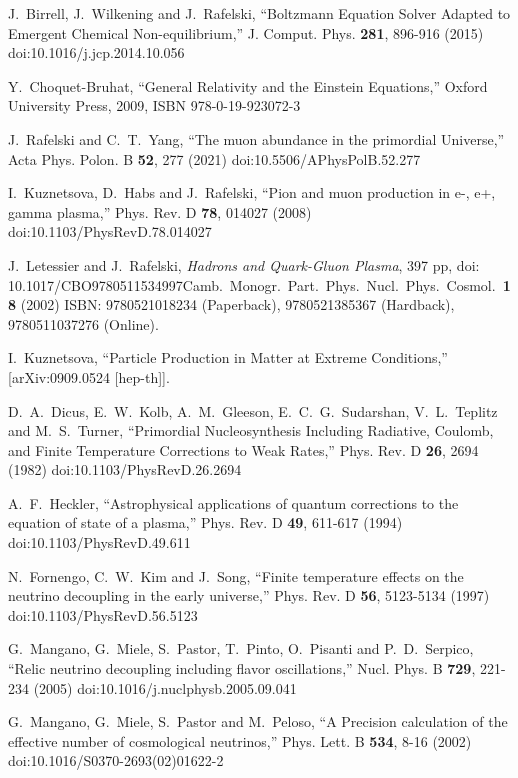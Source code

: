 \documentclass[universe,article,submit,moreauthors,pdftex,a4paper]{Definitions/mdpi}
\begin{document}
\begin{thebibliography}{99}
J.~Birrell, J.~Wilkening and J.~Rafelski,
``Boltzmann Equation Solver Adapted to Emergent Chemical Non-equilibrium,''
J. Comput. Phys. \textbf{281}, 896-916 (2015)
doi:10.1016/j.jcp.2014.10.056

Y.~Choquet-Bruhat,
``General Relativity and the Einstein Equations,''
Oxford University Press, 2009,
ISBN 978-0-19-923072-3

J.~Rafelski and C.~T.~Yang,
``The muon abundance in the primordial Universe,''
Acta Phys. Polon. B \textbf{52}, 277 (2021)
doi:10.5506/APhysPolB.52.277

I.~Kuznetsova, D.~Habs and J.~Rafelski,
``Pion and muon production in e-, e+, gamma plasma,''
Phys. Rev. D \textbf{78}, 014027 (2008)
doi:10.1103/PhysRevD.78.014027


J.~Letessier and J.~Rafelski,
\emph{Hadrons and Quark-Gluon Plasma}, 
397 pp, doi: {10.1017/CBO9780511534997}{Camb.\ Monogr.\ Part.\ Phys.\ Nucl.\ Phys.\ Cosmol.\ {\bf 18} (2002)}
ISBN: 9780521018234 (Paperback), 9780521385367 (Hardback), 9780511037276 (Online).

I.~Kuznetsova,
``Particle Production in Matter at Extreme Conditions,''
[arXiv:0909.0524 [hep-th]].

D.~A.~Dicus, E.~W.~Kolb, A.~M.~Gleeson, E.~C.~G.~Sudarshan, V.~L.~Teplitz and M.~S.~Turner,
``Primordial Nucleosynthesis Including Radiative, Coulomb, and Finite Temperature Corrections to Weak Rates,''
Phys. Rev. D \textbf{26}, 2694 (1982)
doi:10.1103/PhysRevD.26.2694

A.~F.~Heckler,
``Astrophysical applications of quantum corrections to the equation of state of a plasma,''
Phys. Rev. D \textbf{49}, 611-617 (1994)
doi:10.1103/PhysRevD.49.611

N.~Fornengo, C.~W.~Kim and J.~Song,
``Finite temperature effects on the neutrino decoupling in the early universe,''
Phys. Rev. D \textbf{56}, 5123-5134 (1997)
doi:10.1103/PhysRevD.56.5123

G.~Mangano, G.~Miele, S.~Pastor, T.~Pinto, O.~Pisanti and P.~D.~Serpico,
``Relic neutrino decoupling including flavor oscillations,''
Nucl. Phys. B \textbf{729}, 221-234 (2005)
doi:10.1016/j.nuclphysb.2005.09.041

G.~Mangano, G.~Miele, S.~Pastor and M.~Peloso,
``A Precision calculation of the effective number of cosmological neutrinos,''
Phys. Lett. B \textbf{534}, 8-16 (2002)
doi:10.1016/S0370-2693(02)01622-2


\end{thebibliography}
\end{document}
